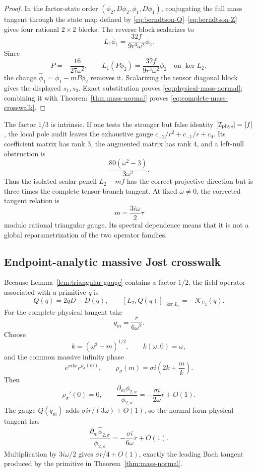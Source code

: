 \documentclass[11pt]{article}
\theoremstyle{remark}
\begin{document}
\begin{proof}
In the factor-state order
\((\phi_2,D\phi_2,\phi_1,D\phi_1)\), conjugating the full mass tangent
through the state map defined by
\eqref{eq:berndtson-Q}--\eqref{eq:berndtson-Z} gives four rational
\(2\times2\) blocks.  The reverse block scalarizes to
\[
 L_1\dot\phi_1=
 \frac{32f}{9r^3\omega^2}\phi_2.
\]
Since
\[
 P=-\frac{16}{27\omega^2},\qquad
 L_1(P\phi_2)=\frac{32f}{9r^3\omega^2}\phi_2
 \quad\text{on }\ker L_2,
\]
the change \(\widehat\phi_1=\phi_1-mP\phi_2\) removes it.  Scalarizing
the tensor diagonal block gives the displayed \(s_1,s_0\).  Exact
substitution proves \eqref{eq:physical-mass-normal}; combining it with
Theorem~\ref{thm:mass-normal} proves
\eqref{eq:complete-mass-crosswalk}.
\end{proof}

The factor \(1/3\) is intrinsic.  If one tests the stronger but false
identity \([\mathcal I_{\rm phys}]=[f]\), the local pole audit leaves the
exhaustive gauge \(c_{-2}/r^2+c_{-1}/r+c_0\).  Its coefficient matrix has
rank \(3\), the augmented matrix has rank \(4\), and a left-null
obstruction is
\[
 \frac{80(\omega^2-3)}{3\omega^2}.
\]
Thus the isolated scalar pencil \(L_2-mf\) has the correct projective
direction but is three times the complete tensor-branch tangent.  At
fixed \(\omega\ne0\), the corrected tangent relation is
\[
 m=\frac{3i\omega}{2}\tau
\]
modulo rational triangular gauge.  Its spectral dependence means that it
is not a global reparametrization of the two operator families.

\subsection{Endpoint-analytic massive Jost crosswalk}

Because Lemma~\ref{lem:triangular-gauge} contains a factor \(1/2\), the
field operator associated with a primitive \(q\) is
\[
 Q(q)=2qD-D(q),\qquad
 [L_2,Q(q)]|_{\ker L_2}=-\mathcal K_{U_2}(q).
\]
For the complete physical tangent take
\[
 q_m=\frac{r}{6\omega^2}.
\]
Choose
\[
 k=(\omega^2-m)^{1/2},\qquad k(\omega,0)=\omega,
\]
and the common massive infinity phase
\[
 e^{\sigma ikr}r^{\rho_\sigma(m)},\qquad
 \rho_\sigma(m)=\sigma i\left(2k+\frac{m}{k}\right).
\]
Then
\[
 \rho_\sigma'(0)=0,\qquad
 \frac{\partial_m\phi_{2,\sigma}}{\phi_{2,\sigma}}
 =-\frac{\sigma i}{2\omega}r+O(1).
\]
The gauge \(Q(q_m)\) adds \(\sigma ir/(3\omega)+O(1)\), so the
normal-form physical tangent has
\[
 \frac{\partial_m\widehat\phi_{2,\sigma}}{\phi_{2,\sigma}}
 =-\frac{\sigma i}{6\omega}r+O(1).
\]
Multiplication by \(3i\omega/2\) gives \(\sigma r/4+O(1)\), exactly the
leading Bach tangent produced by the primitive in
Theorem~\ref{thm:mass-normal}.
\end{document}
